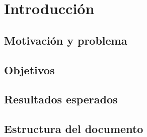 \chapter{Introducción}
\label{ch:chap01}




\section{Motivación y problema}
\label{sec:motivacionYProblemas}




\section{Objetivos}
\label{sec:objetivos}




\section{Resultados esperados}
\label{sec:resultadosEsperados}





\section{Estructura del documento}
\label{sec:estructuraDelDocumento}


